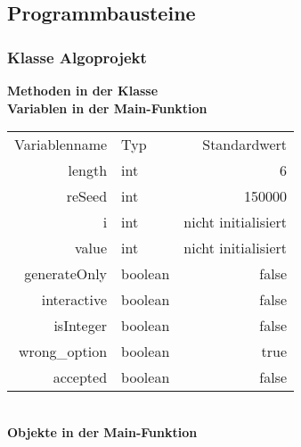 \documentclass[11pt]{article}
\begin{document}
  \subsection{Programmbausteine}
  \subsubsection{Klasse Algoprojekt}
  \textbf{Methoden in der Klasse}\\
  \textbf{Variablen in der Main-Funktion}\\
  \begin{tabular}{rlr}
  Variablenname & Typ & Standardwert \\
  length & int & 6 \\
  reSeed & int & 150000 \\
  i & int & nicht initialisiert \\
  value & int & nicht initialisiert \\
  generateOnly & boolean & false \\
  interactive & boolean & false \\
  isInteger & boolean & false \\
  wrong\_option & boolean & true \\
  accepted & boolean & false \\
  
  \end{tabular}\\
  \textbf{Objekte in der Main-Funktion}\\
\end{document}
